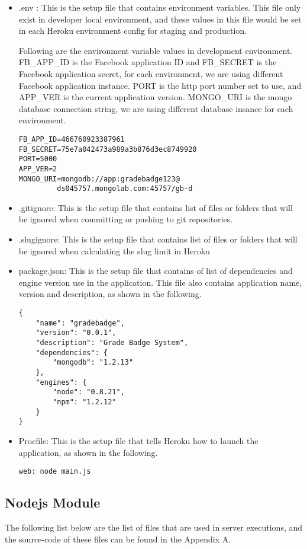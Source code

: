 \begin{itemize}
\item .env : This is the setup file that contains environment variables. This file only exist in developer local environment, and these values in this file would be set in each Heroku environment config for staging and production.

Following are the environment variable values in development environment. FB{\_}APP{\_}ID is the Facebook application ID and FB{\_}SECRET is the Facebook application secret, for each environment, we are using different Facebook application instance. PORT is the http port number set to use, and APP{\_}VER is the current application version. MONGO{\_}URI is the mongo database connection string, we are using different database insance for each environment.
\begin{lstlisting}
FB_APP_ID=466760923387961
FB_SECRET=75e7a042473a989a3b876d3ec8749920
PORT=5000
APP_VER=2
MONGO_URI=mongodb://app:gradebadge123@
         ds045757.mongolab.com:45757/gb-d
\end{lstlisting} 

\item .gitignore: This is the setup file that contains list of files or folders that will be ignored when committing or pushing to git repositories. 
\item .slugignore: This is the setup file that contains list of files or folders that will be ignored when calculating the slug limit in Heroku
\item package.json: This is the setup file that contains of list of dependencies and engine version use in the application. This file also contains application name, version and description, as shown in the following. 
\begin{lstlisting}
{
    "name": "gradebadge",
    "version": "0.0.1",
    "description": "Grade Badge System",
    "dependencies": {
        "mongodb": "1.2.13"
    },
    "engines": {
        "node": "0.8.21",
        "npm": "1.2.12"
    }
}
\end{lstlisting} 

\item Procfile: This is the setup file that tells Heroku how to launch the application, as shown in the following.
\begin{lstlisting}
web: node main.js
\end{lstlisting} 

\end{itemize}

\subsection{Nodejs Module}
The following list below are the list of files that are used in server executions, and the source-code of these files can be found in the Appendix A.

